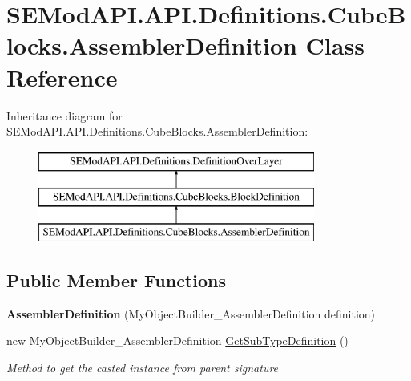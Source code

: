 \hypertarget{class_s_e_mod_a_p_i_1_1_a_p_i_1_1_definitions_1_1_cube_blocks_1_1_assembler_definition}{}\section{S\+E\+Mod\+A\+P\+I.\+A\+P\+I.\+Definitions.\+Cube\+Blocks.\+Assembler\+Definition Class Reference}
\label{class_s_e_mod_a_p_i_1_1_a_p_i_1_1_definitions_1_1_cube_blocks_1_1_assembler_definition}
Inheritance diagram for S\+E\+Mod\+A\+P\+I.\+A\+P\+I.\+Definitions.\+Cube\+Blocks.\+Assembler\+Definition\+:\begin{figure}[H]
\begin{center}
\leavevmode
\includegraphics[height=3.000000cm]{class_s_e_mod_a_p_i_1_1_a_p_i_1_1_definitions_1_1_cube_blocks_1_1_assembler_definition}
\end{center}
\end{figure}
\subsection*{Public Member Functions}
\begin{DoxyCompactItemize}
\item 
\hypertarget{class_s_e_mod_a_p_i_1_1_a_p_i_1_1_definitions_1_1_cube_blocks_1_1_assembler_definition_a38c9aafe9c50856e70a405d8780209cc}{}{\bfseries Assembler\+Definition} (My\+Object\+Builder\+\_\+\+Assembler\+Definition definition)\label{class_s_e_mod_a_p_i_1_1_a_p_i_1_1_definitions_1_1_cube_blocks_1_1_assembler_definition_a38c9aafe9c50856e70a405d8780209cc}

\item 
new My\+Object\+Builder\+\_\+\+Assembler\+Definition \hyperlink{class_s_e_mod_a_p_i_1_1_a_p_i_1_1_definitions_1_1_cube_blocks_1_1_assembler_definition_a484a7093eff5b3b8f596f2d913dffad8}{Get\+Sub\+Type\+Definition} ()
\begin{DoxyCompactList}\small\item\em Method to get the casted instance from parent signature \end{DoxyCompactList}\end{DoxyCompactItemize}
